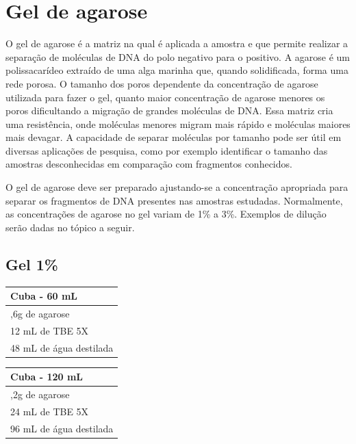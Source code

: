 \documentclass[
  letterpaper,
  DIV=11,
  numbers=noendperiod]{scrreprt}
\begin{document}
\hypertarget{gel-de-agarose}{%
\section{Gel de agarose}\label{gel-de-agarose}}

O gel de agarose é a matriz na qual é aplicada a amostra e que permite
realizar a separação de moléculas de DNA do polo negativo para o
positivo. A agarose é um polissacarídeo extraído de uma alga marinha
que, quando solidificada, forma uma rede porosa. O tamanho dos poros
dependente da concentração de agarose utilizada para fazer o gel, quanto
maior concentração de agarose menores os poros dificultando a migração
de grandes moléculas de DNA. Essa matriz cria uma resistência, onde
moléculas menores migram mais rápido e moléculas maiores mais devagar. A
capacidade de separar moléculas por tamanho pode ser útil em diversas
aplicações de pesquisa, como por exemplo identificar o tamanho das
amostras desconhecidas em comparação com fragmentos conhecidos.

O gel de agarose deve ser preparado ajustando-se a concentração
apropriada para separar os fragmentos de DNA presentes nas amostras
estudadas. Normalmente, as concentrações de agarose no gel variam de 1\%
a 3\%. Exemplos de dilução serão dadas no tópico a seguir.

\hypertarget{gel-1}{%
\subsection{Gel 1\%}\label{gel-1}}

\begin{longtable}[]{@{}l@{}}
\toprule\noalign{}
Cuba - 60 mL \\
\midrule\noalign{}
\endhead
\bottomrule\noalign{}
\endlastfoot
0,6g de agarose \\
12 mL de TBE 5X \\
48 mL de água destilada \\
\end{longtable}

\begin{longtable}[]{@{}l@{}}
\toprule\noalign{}
Cuba - 120 mL \\
\midrule\noalign{}
\endhead
\bottomrule\noalign{}
\endlastfoot
1,2g de agarose \\
24 mL de TBE 5X \\
96 mL de água destilada \\
\end{longtable}
\end{document}
